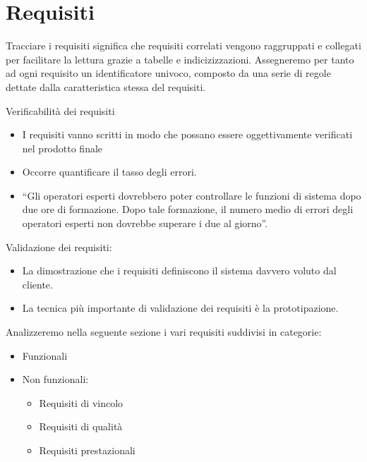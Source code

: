 \section{Requisiti}
    Tracciare i requisiti significa che requisiti correlati vengono raggruppati e collegati per facilitare la lettura grazie a tabelle e indicizizzazioni.
    Assegneremo per tanto ad ogni requisito un identificatore univoco, composto da una serie di regole dettate dalla caratteristica stessa del requisiti.
    
    Verificabilità dei requisiti
    \begin{itemize}
    	\item I requisiti vanno scritti in modo che possano essere
    oggettivamente verificati nel prodotto finale
        \item Occorre quantificare il tasso degli errori.
        \item “Gli operatori esperti dovrebbero poter controllare le
    funzioni di sistema dopo due ore di formazione. Dopo tale formazione, il numero medio di errori degli operatori esperti non dovrebbe superare i due al giorno”.
    \end{itemize}
    
    Validazione dei requisiti:
    \begin{itemize}
        \item La dimostrazione che i requisiti definiscono il
    sistema davvero voluto dal cliente.
        \item La tecnica più importante di validazione dei
    requisiti è la prototipazione.
    \end{itemize}

    Analizzeremo nella seguente sezione i vari requisiti suddivisi in categorie:
    \begin{itemize}
        \item Funzionali
        \item Non funzionali:
            \begin{itemize}
                \item Requisiti di vincolo
                \item Requisiti di qualità
                \item Requisiti prestazionali
            \end{itemize}
    \end{itemize}
